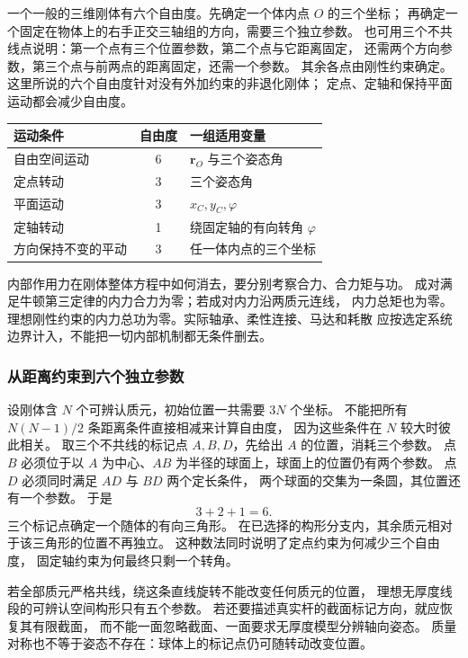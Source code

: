 \documentclass[UTF8,zihao=-4,fontset=fandol,a4paper]{ctexart}
\newcommand{\vect}[1]{\bm{#1}}
\begin{document}
一个一般的三维刚体有六个自由度。先确定一个体内点 $O$ 的三个坐标；
再确定一个固定在物体上的右手正交三轴组的方向，需要三个独立参数。
也可用三个不共线点说明：第一个点有三个位置参数，第二个点与它距离固定，
还需两个方向参数，第三个点与前两点的距离固定，还需一个参数。
其余各点由刚性约束确定。这里所说的六个自由度针对没有外加约束的非退化刚体；
定点、定轴和保持平面运动都会减少自由度。

\begin{center}
\begin{tabularx}{\linewidth}{l c X}
\toprule
运动条件&自由度&一组适用变量\\\midrule
自由空间运动&6&$\vect r_O$ 与三个姿态角\\
定点转动&3&三个姿态角\\
平面运动&3&$x_C,y_C,\varphi$\\
定轴转动&1&绕固定轴的有向转角 $\varphi$\\
方向保持不变的平动&3&任一体内点的三个坐标\\\bottomrule
\end{tabularx}
\end{center}
内部作用力在刚体整体方程中如何消去，要分别考察合力、合力矩与功。
成对满足牛顿第三定律的内力合力为零；若成对内力沿两质元连线，
内力总矩也为零。理想刚性约束的内力总功为零。实际轴承、柔性连接、马达和耗散
应按选定系统边界计入，不能把一切内部机制都无条件删去。


\subsubsection*{从距离约束到六个独立参数}
设刚体含 $N$ 个可辨认质元，初始位置一共需要 $3N$ 个坐标。
不能把所有 $N(N-1)/2$ 条距离条件直接相减来计算自由度，
因为这些条件在 $N$ 较大时彼此相关。
取三个不共线的标记点 $A,B,D$，先给出 $A$ 的位置，消耗三个参数。
点 $B$ 必须位于以 $A$ 为中心、$AB$ 为半径的球面上，球面上的位置仍有两个参数。
点 $D$ 必须同时满足 $AD$ 与 $BD$ 两个定长条件，
两个球面的交集为一条圆，其位置还有一个参数。
于是
\[
3+2+1=6.
\]
三个标记点确定一个随体的有向三角形。
在已选择的构形分支内，其余质元相对于该三角形的位置不再独立。
这种数法同时说明了定点约束为何减少三个自由度，
固定轴约束为何最终只剩一个转角。

若全部质元严格共线，绕这条直线旋转不能改变任何质元的位置，
理想无厚度线段的可辨认空间构形只有五个参数。
若还要描述真实杆的截面标记方向，就应恢复其有限截面，
而不能一面忽略截面、一面要求无厚度模型分辨轴向姿态。
质量对称也不等于姿态不存在：球体上的标记点仍可随转动改变位置。
\end{document}
